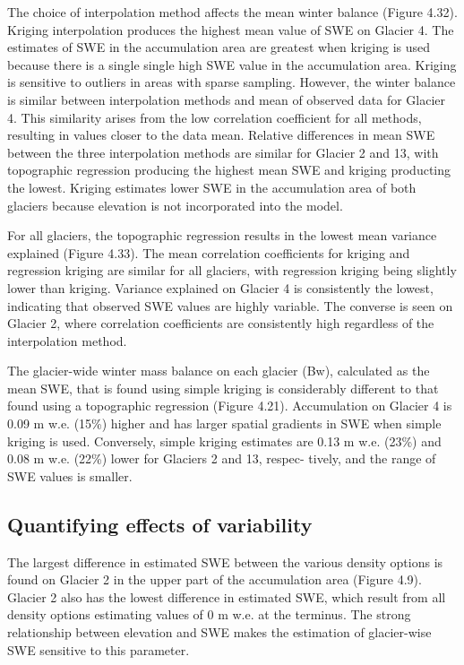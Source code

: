 \documentclass[twocolumn,letterpaper]{igs}
\begin{document}
The choice of interpolation method affects the mean winter balance (Figure 4.32). Kriging interpolation produces the highest mean value of SWE on Glacier 4. The estimates of SWE in the accumulation area are greatest when kriging is used because there is a single single high SWE value in the accumulation area. Kriging is sensitive to outliers in areas with sparse sampling. However, the winter balance is similar between interpolation methods and mean of observed data for Glacier 4. This similarity arises from the low correlation coefficient for all methods, resulting in values closer to the data mean. Relative differences in mean SWE between the three interpolation methods are similar for Glacier 2 and 13, with topographic regression producing the highest mean SWE and kriging producting the lowest. Kriging estimates lower SWE in the accumulation area of both glaciers because elevation is not incorporated into the model.

For all glaciers, the topographic regression results in the lowest mean variance explained (Figure 4.33). The mean correlation coefficients for kriging and regression kriging are similar for all glaciers, with regression kriging being slightly lower than kriging. Variance explained on Glacier 4 is consistently the lowest, indicating that observed SWE values are highly variable. The converse is seen on Glacier 2, where correlation coefficients are consistently high regardless of the interpolation method.

The glacier-wide winter mass balance on each glacier (Bw), calculated as the mean SWE, that is found using simple kriging is considerably different to that found using a topographic regression (Figure 4.21). Accumulation on Glacier 4 is 0.09 m w.e. (15\%) higher and has larger spatial gradients in SWE when simple kriging is used. Conversely, simple kriging estimates are 0.13 m w.e. (23\%) and 0.08 m w.e. (22\%) lower for Glaciers 2 and 13, respec- tively, and the range of SWE values is smaller.

\subsection{Quantifying effects of variability}




The largest difference in estimated SWE between the various density options is found on Glacier 2 in the upper part of the accumulation area (Figure 4.9). Glacier 2 also has the lowest difference in estimated SWE, which result from all density options estimating values of 0 m w.e. at the terminus. The strong relationship between elevation and SWE makes the estimation of glacier-wise SWE sensitive to this parameter.
\end{document}
